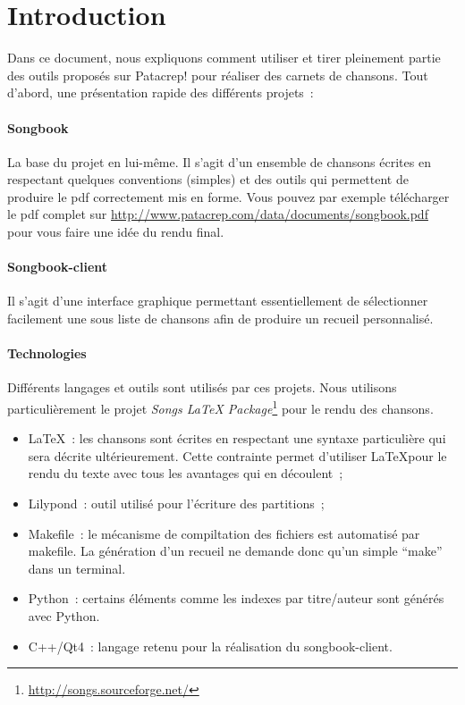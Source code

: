 \documentclass[online]{patacrep}
\begin{document}

\ClearShipoutPicture

\thispagestyle{empty}
\tableofcontents \newpage

\section*{Introduction}

Dans ce document, nous expliquons comment utiliser et tirer pleinement
partie des outils proposés sur Patacrep! pour réaliser des carnets de
chansons. Tout d'abord, une présentation rapide des différents
projets~:

\paragraph{Songbook}
La base du projet en lui-même. Il s'agit d'un ensemble de chansons
écrites en respectant quelques conventions (simples) et des outils qui
permettent de produire le pdf correctement mis en forme. Vous pouvez
par exemple télécharger le pdf complet sur
\url{http://www.patacrep.com/data/documents/songbook.pdf} pour
vous faire une idée du rendu final.

\paragraph{Songbook-client} 
Il s'agit d'une interface graphique permettant essentiellement de
sélectionner facilement une sous liste de chansons afin de produire un
recueil personnalisé.

\paragraph{Technologies} 
Différents langages et outils sont utilisés par ces projets.  Nous
utilisons particulièrement le projet \emph{Songs LaTeX
Package}\footnote{\url{http://songs.sourceforge.net/}} pour le rendu
des chansons.

\begin{itemize}
\item \LaTeX~: les chansons sont écrites en respectant une syntaxe
  particulière qui sera décrite ultérieurement. Cette contrainte
  permet d'utiliser \LaTeX pour le rendu du texte avec tous les
  avantages qui en découlent~;
\item Lilypond~: outil utilisé pour l'écriture des partitions~;
\item Makefile~: le mécanisme de compiltation des fichiers est
  automatisé par makefile.  La génération d'un recueil ne demande donc
  qu'un simple ``make'' dans un terminal.
\item Python~: certains éléments comme les indexes par titre/auteur
  sont générés avec Python.
\item C++/Qt4~: langage retenu pour la réalisation du songbook-client.
\end{itemize}
\end{document}
